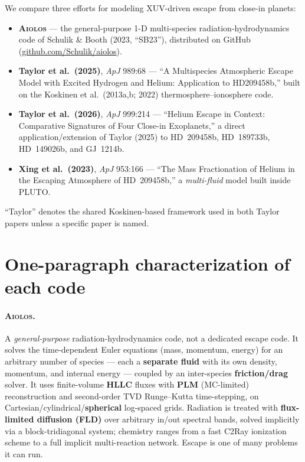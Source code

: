 \documentclass[11pt]{article}
\newcommand{\AIOLOS}{\textsc{Aiolos}}
\begin{document}
We compare three efforts for modeling XUV-driven escape from close-in planets:
\begin{itemize}[nosep]
  \item \textbf{\AIOLOS} --- the general-purpose 1-D multi-species radiation-hydrodynamics
    code of Schulik \& Booth (2023, ``SB23''), distributed on GitHub
    (\url{github.com/Schulik/aiolos}).
  \item \textbf{Taylor et al.\ (2025)}, \emph{ApJ} 989:68 --- ``A Multispecies Atmospheric
    Escape Model with Excited Hydrogen and Helium: Application to HD209458b,'' built on the
    Koskinen et al.\ (2013a,b; 2022) thermosphere--ionosphere code.
  \item \textbf{Taylor et al.\ (2026)}, \emph{ApJ} 999:214 --- ``Helium Escape in Context:
    Comparative Signatures of Four Close-in Exoplanets,'' a direct application/extension of
    Taylor (2025) to HD~209458b, HD~189733b, HD~149026b, and GJ~1214b.
  \item \textbf{Xing et al.\ (2023)}, \emph{ApJ} 953:166 --- ``The Mass Fractionation of
    Helium in the Escaping Atmosphere of HD~209458b,'' a \emph{multi-fluid} model built
    inside PLUTO.
\end{itemize}
``Taylor'' denotes the shared Koskinen-based framework used in both Taylor papers unless a
specific paper is named.

\section{One-paragraph characterization of each code}

\paragraph{\AIOLOS.} A \emph{general-purpose} radiation-hydrodynamics code, not a dedicated
escape code. It solves the time-dependent Euler equations (mass, momentum, energy) for an
arbitrary number of species --- each a \textbf{separate fluid} with its own density,
momentum, and internal energy --- coupled by an inter-species \textbf{friction/drag} solver.
It uses finite-volume \textbf{HLLC} fluxes with \textbf{PLM} (MC-limited) reconstruction and
second-order TVD Runge--Kutta time-stepping, on Cartesian/cylindrical/\textbf{spherical}
log-spaced grids. Radiation is treated with \textbf{flux-limited diffusion (FLD)} over
arbitrary in/out spectral bands, solved implicitly via a block-tridiagonal system; chemistry
ranges from a fast C2Ray ionization scheme to a full implicit multi-reaction network. Escape
is one of many problems it can run.
\end{document}
